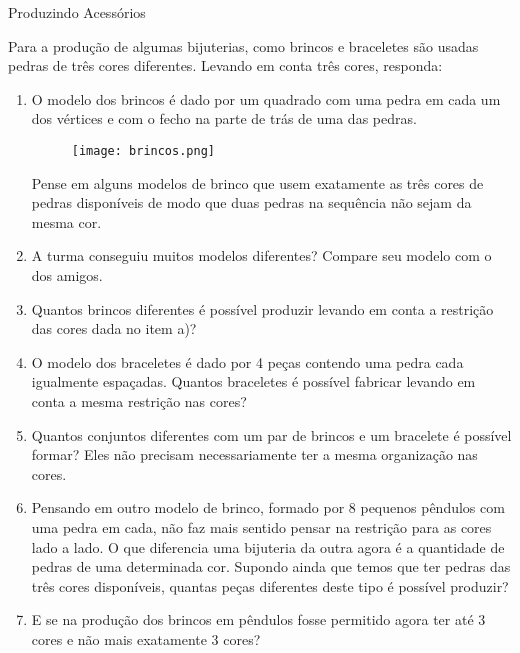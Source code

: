 \begin{task}{Produzindo Acessórios}

Para a produção de algumas bijuterias, como brincos e braceletes são usadas pedras de três cores diferentes. Levando em conta três cores, responda:
 
\begin{enumerate}
\item O modelo dos brincos é dado por um quadrado com uma pedra em cada um dos vértices e com o fecho na parte de trás de uma das pedras. 

\begin{figure}[H]
\centering

\texttt{[image: brincos.png]}
\end{figure}

Pense em alguns modelos de brinco que usem exatamente as  três cores de pedras disponíveis de modo que duas pedras na sequência não sejam da mesma cor.

\item A turma conseguiu muitos modelos diferentes? Compare seu modelo com o dos amigos.
\item Quantos brincos diferentes é possível produzir levando em conta a restrição das cores dada no item a)?
\item O modelo dos braceletes é dado por 4 peças contendo uma pedra cada igualmente espaçadas.  Quantos braceletes é possível fabricar levando em conta a mesma restrição nas cores?
\item Quantos conjuntos diferentes com um par de brincos e um bracelete é possível formar? Eles não precisam necessariamente ter a mesma organização nas cores.
\item Pensando em outro modelo de brinco, formado por 8 pequenos pêndulos com uma pedra em cada, não faz mais sentido pensar na restrição para as cores lado a lado. O que diferencia uma bijuteria da outra agora é a quantidade de pedras de uma determinada cor. Supondo ainda que temos que ter pedras das três cores disponíveis,  quantas peças diferentes deste tipo é possível produzir?  
\item E se na produção dos brincos em pêndulos fosse permitido agora ter até 3 cores e não mais exatamente 3 cores? 
      
 \end{enumerate}
\end{task}

